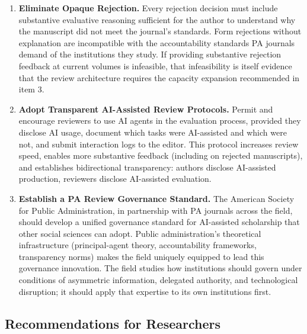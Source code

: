 \documentclass[12pt]{article}
\begin{document}
\begin{enumerate}
\item \textbf{Eliminate Opaque Rejection.}
Every rejection decision must include substantive evaluative reasoning sufficient for
the author to understand why the manuscript did not meet the journal's standards. Form
rejections without explanation are incompatible with the accountability standards PA
journals demand of the institutions they study. If providing substantive rejection
feedback at current volumes is infeasible, that infeasibility is itself evidence that
the review architecture requires the capacity expansion recommended in item 3.

\item \textbf{Adopt Transparent AI-Assisted Review Protocols.}
Permit and encourage reviewers to use AI agents in the evaluation process, provided they
disclose AI usage, document which tasks were AI-assisted and which were not, and submit
interaction logs to the editor. This protocol increases review speed, enables more
substantive feedback (including on rejected manuscripts), and establishes bidirectional
transparency: authors disclose AI-assisted production, reviewers disclose AI-assisted
evaluation.

\item \textbf{Establish a PA Review Governance Standard.}
The American Society for Public Administration, in partnership with PA journals across the field, should develop a unified governance standard for AI-assisted scholarship
that other social sciences can adopt. Public administration's theoretical infrastructure
(principal-agent theory, accountability frameworks, transparency norms) makes the field
uniquely equipped to lead this governance innovation. The field studies how institutions
should govern under conditions of asymmetric information, delegated authority, and
technological disruption; it should apply that expertise to its own institutions first.

\end{enumerate}

\subsection{Recommendations for Researchers}
\end{document}
